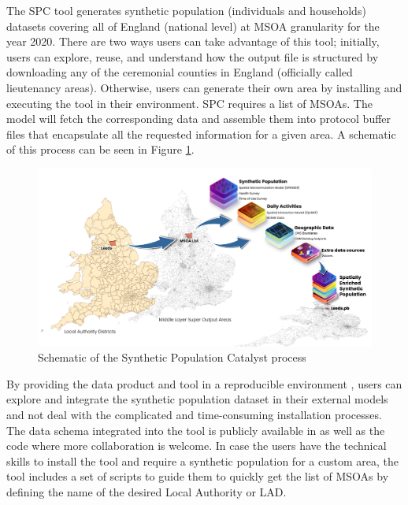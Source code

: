 \documentclass{article}
\begin{document}
\noindent The SPC tool generates synthetic population (individuals and households) datasets covering all of England (national level) at MSOA granularity for the year 2020. There are two ways users can take advantage of this tool; initially, users can explore, reuse, and understand how the output file is structured by downloading any of the ceremonial counties in England (officially called lieutenancy areas). Otherwise, users can generate their own area by installing and executing the tool in their environment. SPC requires a list of MSOAs. The model will fetch the corresponding data and assemble them into protocol buffer files that encapsulate all the requested information for a given area. A schematic of this process can be seen in  Figure \ref{fig:SPC}.\\


\begin{figure}[h]
\centering
\includegraphics[width = \textwidth]{Figures/SPC_Schema.png}
\caption{Schematic of the Synthetic Population Catalyst process }\label{fig:SPC}
\end{figure}



\noindent By providing the data product and tool in a reproducible environment \citep{CarlinoRepo}, users can explore and integrate the synthetic population dataset in their external models and not deal with the complicated and time-consuming installation processes. The data schema integrated into the tool is publicly available in \citep{CarlinoRepo} as well as the code where more collaboration is welcome. In case the users have the technical skills to install the tool and require a synthetic population for a custom area, the tool includes a set of scripts to guide them to quickly get the list of MSOAs by defining the name of the desired Local Authority or LAD. \\
\end{document}
